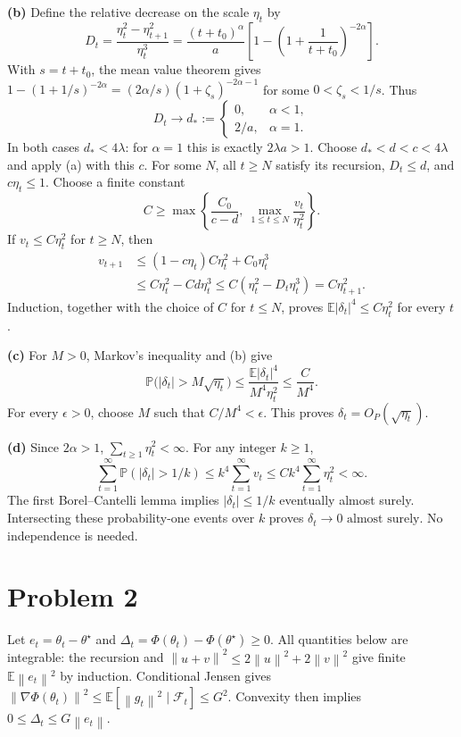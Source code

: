 \documentclass[11pt]{article}
\newcommand{\E}{\mathbb E}
\newcommand{\Pp}{\mathbb P}
\newcommand{\norm}[1]{\left\lVert#1\right\rVert}
\begin{document}
\textbf{(b)} Define the relative decrease on the scale $\eta_t$ by
\[
 D_t=\frac{\eta_t^2-\eta_{t+1}^2}{\eta_t^3}
 =\frac{(t+t_0)^\alpha}{a}
 \left[1-\left(1+\frac1{t+t_0}\right)^{-2\alpha}\right].
\]
With $s=t+t_0$, the mean value theorem gives
$1-(1+1/s)^{-2\alpha}=(2\alpha/s)(1+\zeta_s)^{-2\alpha-1}$
for some $0<\zeta_s<1/s$. Thus
\[
 D_t\longrightarrow d_*:=
 \begin{cases}0,&\alpha<1,\\2/a,&\alpha=1.\end{cases}
\]
In both cases $d_*<4\lambda$: for $\alpha=1$ this is exactly
$2\lambda a>1$. Choose $d_*<d<c<4\lambda$ and apply (a) with this $c$.
For some $N$, all $t\geq N$ satisfy its recursion, $D_t\leq d$, and
$c\eta_t\leq1$. Choose a finite constant
\[
 C\geq\max\left\{\frac{C_0}{c-d},\ \max_{1\leq t\leq N}\frac{v_t}{\eta_t^2}\right\}.
\]
If $v_t\leq C\eta_t^2$ for $t\geq N$, then
\begin{align*}
 v_{t+1}&\leq(1-c\eta_t)C\eta_t^2+C_0\eta_t^3\\
 &\leq C\eta_t^2-Cd\eta_t^3
 \leq C(\eta_t^2-D_t\eta_t^3)=C\eta_{t+1}^2.
\end{align*}
Induction, together with the choice of $C$ for $t\leq N$, proves
$\boxed{\E|\delta_t|^4\leq C\eta_t^2}$ for every $t$.

\textbf{(c)} For $M>0$, Markov's inequality and (b) give
\[
 \Pp\big(|\delta_t|>M\sqrt{\eta_t}\big)
 \leq\frac{\E|\delta_t|^4}{M^4\eta_t^2}\leq\frac C{M^4}.
\]
For every $\epsilon>0$, choose $M$ such that $C/M^4<\epsilon$.
This proves $\delta_t=O_P(\sqrt{\eta_t})$.

\textbf{(d)} Since $2\alpha>1$, $\sum_{t\geq1}\eta_t^2<\infty$.
For any integer $k\geq1$,
\[
 \sum_{t=1}^\infty\Pp(|\delta_t|>1/k)
 \leq k^4\sum_{t=1}^\infty v_t
 \leq Ck^4\sum_{t=1}^\infty\eta_t^2<\infty.
\]
The first Borel--Cantelli lemma implies $|\delta_t|\leq1/k$ eventually
almost surely. Intersecting these probability-one events over $k$ proves
$\boxed{\delta_t\to0\text{ almost surely}}$. No independence is needed.

\section*{Problem 2}
Let $e_t=\theta_t-\theta^\star$ and
$\Delta_t=\Phi(\theta_t)-\Phi(\theta^\star)\geq0$.
All quantities below are integrable: the recursion and
$\norm{u+v}^2\leq2\norm u^2+2\norm v^2$ give finite $\E\norm{e_t}^2$
by induction. Conditional Jensen gives
$\norm{\nabla\Phi(\theta_t)}^2\leq\E[\norm{g_t}^2\mid\mathcal F_t]\leq G^2$.
Convexity then implies $0\leq\Delta_t\leq G\norm{e_t}$.
\end{document}
